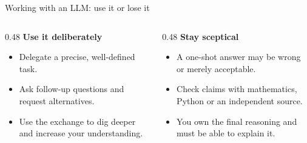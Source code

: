 \documentclass{beamer}
\begin{document}
\begin{frame}{Working with an LLM: use it or lose it}
  \begin{columns}[T,onlytextwidth]
    \begin{column}{0.48\textwidth}
      \textbf{Use it deliberately}
      \begin{itemize}
        \item Delegate a precise, well-defined task.
        \item Ask follow-up questions and request alternatives.
        \item Use the exchange to dig deeper and increase your understanding.
      \end{itemize}
    \end{column}
    \begin{column}{0.48\textwidth}
      \textbf{Stay sceptical}
      \begin{itemize}
        \item A one-shot answer may be wrong or merely acceptable.
        \item Check claims with mathematics, Python or an independent source.
        \item You own the final reasoning and must be able to explain it.
      \end{itemize}
    \end{column}
  \end{columns}
\end{frame}

\end{document}
